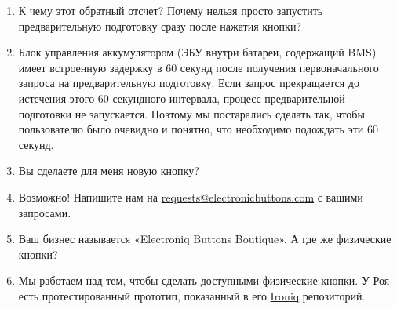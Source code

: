 \documentclass[superscriptaddress,onecolumn,floatfix]{revtex4-2}
\begin{document}
\begin{enumerate}
  \item[В:] К чему этот обратный отсчет? Почему нельзя просто запустить предварительную подготовку сразу после нажатия кнопки?
  \item[A:] Блок управления аккумулятором (ЭБУ внутри батареи, содержащий BMS) имеет встроенную задержку в 60 секунд после получения первоначального запроса на предварительную подготовку. Если запрос прекращается до истечения этого 60-секундного интервала, процесс предварительной подготовки не запускается. Поэтому мы постарались сделать так, чтобы пользователю было очевидно и понятно, что необходимо подождать эти 60 секунд.
  \item[В:] Вы сделаете для меня новую кнопку?
  \item[A:] Возможно! Напишите нам на \href{mailto:requests@electroniqbuttons.com}{requests@electronicbuttons.com} с вашими запросами.
  \item[В:] Ваш бизнес называется «Electroniq Buttons Boutique». А где же физические кнопки?
  \item[A:] Мы работаем над тем, чтобы сделать доступными физические кнопки. У Роя есть протестированный прототип, показанный в его \href{https://github.com/dragz/ironiq}{Ironiq} репозиторий.
\end{enumerate}
\appendix 

{}
\end{document}
